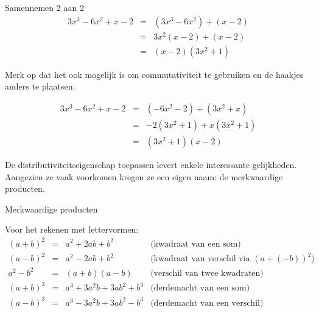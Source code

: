 \documentclass{ximera}
\begin{document}
\begin{example} Samennemen 2 aan 2 
\[ 
\begin{array}{rclr}
    3x^3 - 6x^2 + x - 2 &=& (3x^3 - 6x^2) + (x - 2)\\
    &=& 3x^2(x - 2) + (x - 2)\\
    &=& (x - 2)(3x^2 + 1)
\end{array}  
\]

Merk op dat het ook mogelijk is om commutativiteit te gebruiken en de haakjes anders te plaatsen: 

\[ 
\begin{array}{rclr}
    3x^3 - 6x^2 + x - 2 &=& (- 6x^2 -2) + (3x^2 + x)\\
    &=& -2(3x^2 + 1) + x(3x^2 + 1)\\
    &=& (3x^2 + 1)(x - 2)
\end{array}  
\]
\end{example}




De distributiviteitseigenschap toepassen levert enkele interessante gelijkheden. Aangezien ze vaak voorkomen kregen ze een eigen naam: de merkwaardige producten. 

\begin{proposition} Merkwaardige producten 

Voor het rekenen met lettervormen:    
    \[
    \begin{array}{rclr}
        (a+b)^2    &=& a^2+2ab+b^2         &\text{(kwadraat van een som)}\\
        (a-b)^2    &=& a^2-2ab+b^2         &\text{(kwadraat van verschil via $(a+(-b))^2$)}\\
        a^2-b^2  &=&  (a+b)(a-b)  &      \text{(verschil van twee kwadraten)}\\[1cm]
        (a+b)^3 &=& a^3+3a^2b+3ab^2+b^3 &\text{(derdemacht van een som)}\\
        (a-b)^3 &=& a^3-3a^2b+3ab^2-b^3 &\text{(derdemacht van een verschil)}\\
    \end{array}
    \]
    
\end{proposition}
\end{document}
